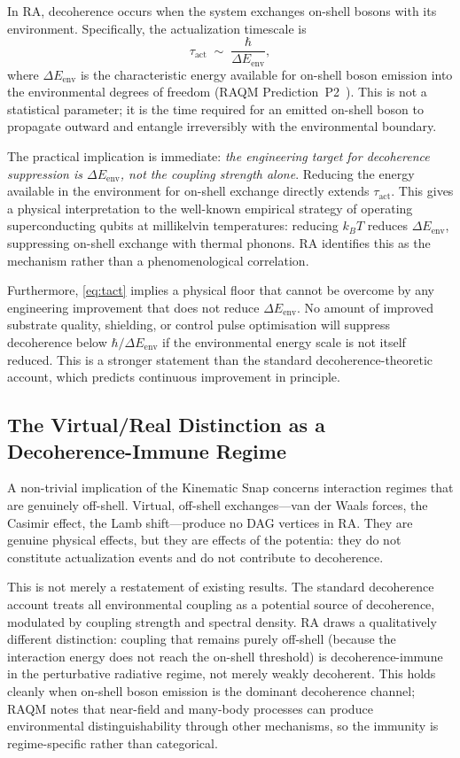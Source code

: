 \documentclass[11pt,a4paper]{article}
\theoremstyle{plain}
\theoremstyle{definition}
\theoremstyle{remark}
\begin{document}
In RA, decoherence occurs when the system exchanges on-shell bosons with its
environment. Specifically, the actualization timescale is
\begin{equation}
  \tau_{\mathrm{act}} \;\sim\; \frac{\hbar}{\Delta E_{\mathrm{env}}},
  \label{eq:tact}
\end{equation}
where $\Delta E_{\mathrm{env}}$ is the characteristic energy available for
on-shell boson emission into the environmental degrees of freedom
(RAQM Prediction~P2~\citep{Sandeman2026a}). This is not a statistical parameter;
it is the time required for an emitted on-shell boson to propagate outward and
entangle irreversibly with the environmental boundary.

The practical implication is immediate: \emph{the engineering target for
decoherence suppression is $\Delta E_{\mathrm{env}}$, not the coupling strength
alone}. Reducing the energy available in the environment for on-shell exchange
directly extends $\tau_{\mathrm{act}}$. This gives a physical interpretation to
the well-known empirical strategy of operating superconducting qubits at millikelvin
temperatures: reducing $k_B T$ reduces $\Delta E_{\mathrm{env}}$, suppressing
on-shell exchange with thermal phonons. RA identifies this as the mechanism rather
than a phenomenological correlation.

Furthermore, \eqref{eq:tact} implies a physical floor that cannot be overcome by
any engineering improvement that does not reduce $\Delta E_{\mathrm{env}}$. No
amount of improved substrate quality, shielding, or control pulse optimisation
will suppress decoherence below $\hbar / \Delta E_{\mathrm{env}}$ if the
environmental energy scale is not itself reduced. This is a stronger statement
than the standard decoherence-theoretic account, which predicts continuous
improvement in principle.

\subsection{The Virtual/Real Distinction as a Decoherence-Immune Regime}

A non-trivial implication of the Kinematic Snap concerns interaction regimes that
are genuinely off-shell. Virtual, off-shell exchanges---van der Waals forces,
the Casimir effect, the Lamb shift---produce no DAG vertices in RA. They are
genuine physical effects, but they are effects of the potentia: they do not
constitute actualization events and do not contribute to decoherence.

This is not merely a restatement of existing results. The standard decoherence
account treats all environmental coupling as a potential source of decoherence,
modulated by coupling strength and spectral density. RA draws a qualitatively
different distinction: coupling that remains purely off-shell (because the
interaction energy does not reach the on-shell threshold) is decoherence-immune
in the perturbative radiative regime, not merely weakly decoherent. This holds
cleanly when on-shell boson emission is the dominant decoherence channel;
RAQM notes that near-field and many-body processes can produce environmental
distinguishability through other mechanisms, so the immunity is regime-specific
rather than categorical.
\end{document}
